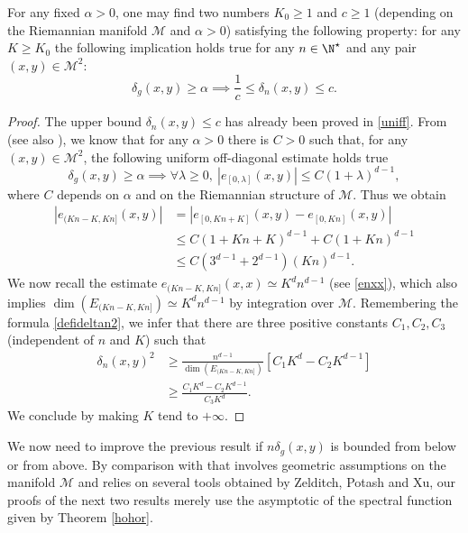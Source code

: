 \begin{prop}\label{far}
For any fixed $\alpha>0$, one may find two numbers $K_0\geq 1$ and $c\geq 1$ (depending on the Riemannian manifold $\mathcal{M}$ and $\alpha>0$) satisfying the following property: for any $K\geq K_0$ the following implication holds true for any $n\in \N^\star$ and any pair $(x,y)\in \mathcal{M}^2$:
\begin{equation*}
\delta_g(x,y)\geq \alpha \implies \frac{1}{c}\leq \delta_n(x,y)\leq c.
\end{equation*}
\end{prop}
\begin{proof}
The upper bound $\delta_n(x,y)\leq c$ has already been proved in \eqref{uniff}.
From \cite[line (4.11)]{horm68} (see also \cite[p.\,162, Th.\,21.1, point\,2)]{shub-pseudo}), we know that for any $\alpha>0$ there is $C>0$ such that, for any $(x,y)\in \mathcal{M}^2$, the following uniform off-diagonal estimate holds true
\begin{equation*}
\delta_g(x,y)\geq \alpha \implies \forall \lambda \geq 0,\ \left\vert e_{[0,\lambda]}(x,y)\right\vert\leq C(1+\lambda)^{d-1},
\end{equation*}
where $C$ depends on $\alpha$ and on the Riemannian structure of $\mathcal{M}$.
Thus we obtain
\begin{align*}
|e_{(Kn-K,Kn]}(x,y)| & = \left\vert e_{[0,Kn+K]}(x,y)-e_{[0,Kn]}(x,y) \right\vert \\
& \leq C(1+K n+K)^{d-1}+C(1+K n)^{d-1} \\
& \leq C(3^{d-1}+2^{d-1}) (Kn)^{d-1}.
\end{align*}
We now recall the estimate $e_{(Kn-K,Kn]}(x,x)\simeq K^d n^{d-1}$ (see \eqref{enxx}), which also implies $\dim(E_{(Kn-K,Kn]})\simeq K^d n^{d-1}$ by integration over $\mathcal{M}$.
Remembering the formula \eqref{defideltan2}, we infer that there are three positive constants $C_1,C_2,C_3$ (independent of $n$ and $K$) such that
\begin{equation}\label{mimin}
\begin{aligned}
\delta_n(x,y)^2&\geq \frac{n^{d-1}}{\dim(E_{(Kn-K,Kn]})}\left[C_1K^{d}-C_2 K^{d-1}\right] \\
& \geq \frac{C_1K^{d}-C_2 K^{d-1}}{C_3 K^d}.
\end{aligned}
\end{equation}
We conclude by making $K$ tend to $+\infty$.
\end{proof}

We now need to improve the previous result if $n\delta_g(x,y)$ is bounded from below or from above.
By comparison with \cite[p.\,1728--1729]{canzani2015scaling} that involves geometric assumptions on the manifold $\mathcal{M}$
and relies on several tools obtained by Zelditch, Potash and Xu, our proofs of the next two results merely use the asymptotic of the spectral function given by Theorem \ref{hohor}.

